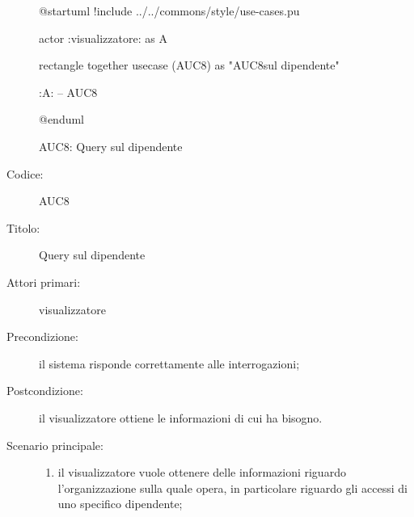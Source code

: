 \documentclass[../../../analisi-dei-requisiti.tex]{subfiles}
\begin{document}
\begin{figure}[H]
  \centering
  \begin{plantuml}
  @startuml
  !include ../../commons/style/use-cases.pu

  actor :visualizzatore: as A

  rectangle {
    together {
      usecase (AUC8) as "AUC8\nQuery sul dipendente"
    }
  }

  :A: -- AUC8

  @enduml
  \end{plantuml}
  \caption{AUC8: Query sul dipendente}%
  \label{fig:AUC8}
\end{figure}

\begin{description}
  \item[Codice:] AUC8
  \item[Titolo:] Query sul dipendente
  \item[Attori primari:] visualizzatore
  \item[Precondizione:] il sistema risponde correttamente alle interrogazioni;
  \item[Postcondizione:] il visualizzatore ottiene le informazioni di cui ha bisogno.
  \item[Scenario principale:]
  \begin{enumerate}
    \item il visualizzatore vuole ottenere delle informazioni riguardo l'organizzazione sulla quale opera, in particolare riguardo gli accessi di uno specifico dipendente;
  \end{enumerate}
\end{description}
\end{document}
